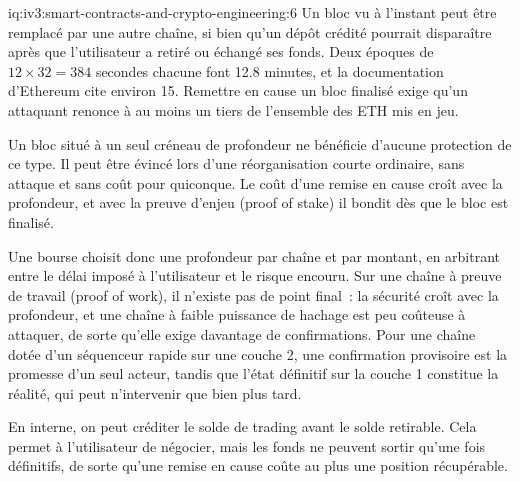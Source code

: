 \begin{solution}{iq:iv3:smart-contracts-and-crypto-engineering:6}
Un bloc vu à l'instant peut être remplacé par une autre chaîne, si bien qu'un dépôt crédité pourrait disparaître après que l'utilisateur a retiré ou échangé ses fonds. Deux époques de $12 \times 32 = 384$ secondes chacune font 12.8 minutes, et la documentation d'Ethereum cite environ 15. Remettre en cause un bloc finalisé exige qu'un attaquant renonce à au moins un tiers de l'ensemble des ETH mis en jeu.

Un bloc situé à un seul créneau de profondeur ne bénéficie d'aucune protection de ce type. Il peut être évincé lors d'une réorganisation courte ordinaire, sans attaque et sans coût pour quiconque. Le coût d'une remise en cause croît avec la profondeur, et avec la preuve d'enjeu (proof of stake) il bondit dès que le bloc est finalisé.

Une bourse choisit donc une profondeur par chaîne et par montant, en arbitrant entre le délai imposé à l'utilisateur et le risque encouru. Sur une chaîne à preuve de travail (proof of work), il n'existe pas de point final~: la sécurité croît avec la profondeur, et une chaîne à faible puissance de hachage est peu coûteuse à attaquer, de sorte qu'elle exige davantage de confirmations. Pour une chaîne dotée d'un séquenceur rapide sur une couche 2, une confirmation provisoire est la promesse d'un seul acteur, tandis que l'état définitif sur la couche 1 constitue la réalité, qui peut n'intervenir que bien plus tard.

En interne, on peut créditer le solde de trading avant le solde retirable. Cela permet à l'utilisateur de négocier, mais les fonds ne peuvent sortir qu'une fois définitifs, de sorte qu'une remise en cause coûte au plus une position récupérable.

\end{solution}

